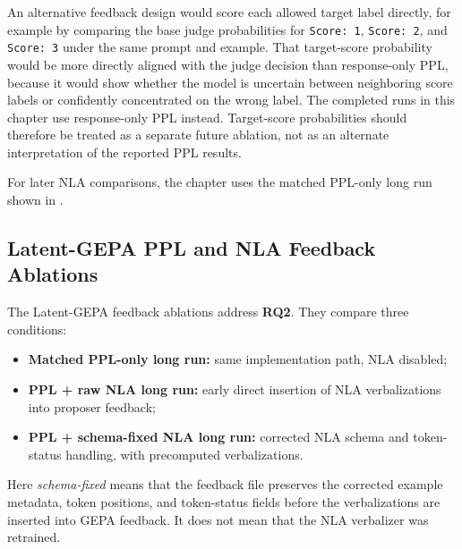 \documentclass[12pt,a4paper,twoside,openright]{book}
\begin{document}
An alternative feedback design would score each allowed target label directly,
for example by comparing the base judge probabilities for \texttt{Score: 1},
\texttt{Score: 2}, and \texttt{Score: 3} under the same prompt and example.
That target-score probability would be more directly aligned with the judge
decision than
response-only PPL, because it would show whether the model is uncertain between
neighboring score labels or confidently concentrated on the wrong label. The
completed runs in this chapter use response-only PPL instead. Target-score
probabilities should therefore be treated as a separate future ablation, not as
an alternate interpretation of the reported PPL results.

For later NLA comparisons, the chapter uses the matched PPL-only long run shown
in .

\subsection{Latent-GEPA PPL and NLA Feedback Ablations}
\label{subsec:results-gepa-nla}

The Latent-GEPA feedback ablations address \textbf{RQ2}. They compare three
conditions:
\begin{itemize}
    \item \textbf{Matched PPL-only long run:} same implementation path, NLA
    disabled;
    \item \textbf{PPL + raw NLA long run:} early direct insertion of NLA
    verbalizations into proposer feedback;
    \item \textbf{PPL + schema-fixed NLA long run:} corrected NLA schema and
    token-status handling, with precomputed verbalizations.
\end{itemize}
Here \textit{schema-fixed} means that the feedback file preserves the corrected
example metadata, token positions, and token-status fields before the
verbalizations are inserted into GEPA feedback. It does not mean that the NLA
verbalizer was retrained.
\end{document}
